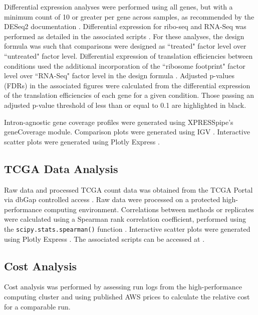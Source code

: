 \documentclass[10pt, oneside]{article}
\begin{document}
\begin{multicols}{2}
Differential expression analyses were performed using all genes, but with a minimum count of 10 or greater per gene across samples, as recommended by the DESeq2 documentation \cite{deseq2}. Differential expression for ribo-seq and RNA-Seq was performed as detailed in the associated scripts \cite{manuscript}. For these analyses, the design formula was such that comparisons were designed as ``treated" factor level over ``untreated" factor level. Differential expression of translation efficiencies between conditions used the additional incorporation of the ``ribosome footprint" factor level over ``RNA-Seq" factor level in the design formula \cite{deseq2,isrib_riboseq,ingolia_meth}. Adjusted p-values (FDRs) in the associated figures were calculated from the differential expression of the translation efficiencies of each gene for a given condition. Those passing an adjusted p-value threshold of less than or equal to 0.1 are highlighted in black. \par

Intron-agnostic gene coverage profiles were generated using XPRESSpipe's geneCoverage module. Comparison plots were generated using IGV \cite{igv}. Interactive scatter plots were generated using Plotly Express \cite{plotly}. \par

\subsection*{TCGA Data Analysis}
Raw data and processed TCGA count data was obtained from the TCGA Portal \cite{tcga} via dbGap controlled access \cite{dbgap}. Raw data were processed on a protected high-performance computing environment. Correlations between methods or replicates were calculated using a Spearman rank correlation coefficient, performed using the \texttt{scipy.stats.spearman()} function \cite{spearman_rnaseq}. Interactive scatter plots were generated using Plotly Express \cite{plotly}. The associated scripts can be accessed at \cite{manuscript}. \par


\subsection*{Cost Analysis}
Cost analysis was performed by assessing run logs from the high-performance computing cluster and using published AWS prices \cite{aws_ec2, aws_s3} to calculate the relative cost for a comparable run.


\end{multicols}
\end{document}
